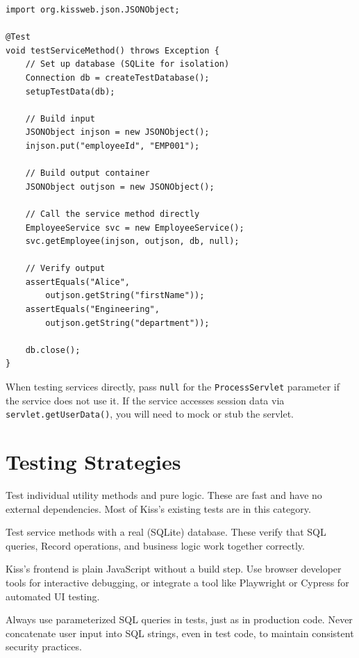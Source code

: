 \begin{lstlisting}[style=java]
import org.kissweb.json.JSONObject;

@Test
void testServiceMethod() throws Exception {
    // Set up database (SQLite for isolation)
    Connection db = createTestDatabase();
    setupTestData(db);

    // Build input
    JSONObject injson = new JSONObject();
    injson.put("employeeId", "EMP001");

    // Build output container
    JSONObject outjson = new JSONObject();

    // Call the service method directly
    EmployeeService svc = new EmployeeService();
    svc.getEmployee(injson, outjson, db, null);

    // Verify output
    assertEquals("Alice",
        outjson.getString("firstName"));
    assertEquals("Engineering",
        outjson.getString("department"));

    db.close();
}
\end{lstlisting}

\begin{notebox}
When testing services directly, pass \texttt{null} for the \texttt{ProcessServlet} parameter if the service does not use it.  If the service accesses session data via \texttt{servlet.getUserData()}, you will need to mock or stub the servlet.
\end{notebox}

\section{Testing Strategies}
\label{sec:test-strategies}

\begin{description}[style=nextline]
  \item[Unit tests] Test individual utility methods and pure logic.  These are fast and have no external dependencies.  Most of Kiss's existing tests are in this category.

  \item[Integration tests] Test service methods with a real (SQLite) database.  These verify that SQL queries, Record operations, and business logic work together correctly.

  \item[Frontend testing] Kiss's frontend is plain JavaScript without a build step.  Use browser developer tools for interactive debugging, or integrate a tool like Playwright or Cypress for automated UI testing.
\end{description}

\begin{warnbox}
Always use parameterized SQL queries in tests, just as in production code.  Never concatenate user input into SQL strings, even in test code, to maintain consistent security practices.
\end{warnbox}
